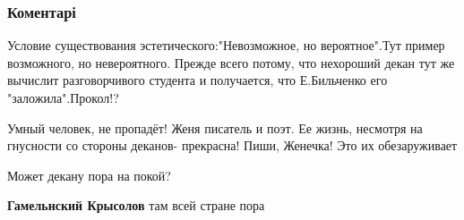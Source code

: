  
 
 
 
 
\subsubsection{Коментарі}

\begin{itemize}
 
Условие существования эстетического:"Невозможное, но вероятное".Тут пример возможного, но невероятного. Прежде всего потому, что нехороший декан тут же вычислит разговорчивого студента и получается, что Е.Бильченко его "заложила".Прокол!?

 
Умный человек, не пропадёт! Женя писатель и поэт.
Ее жизнь, несмотря на гнусности со стороны деканов- прекрасна! Пиши, Женечка!
Это их обезаруживает

 
Может декану пора на покой?

\begin{itemize}
 
\textbf{Гамельнский Крысолов} там всей стране пора


\end{itemize}
\end{itemize}
